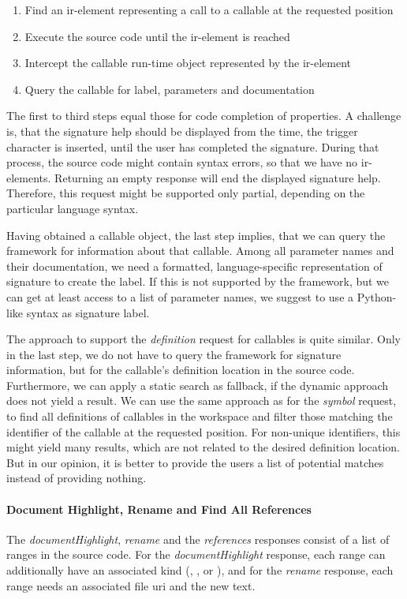\documentclass[sigplan,10pt,review,anonymous]{acmart}
\begin{document}
    \begin{enumerate}
        \item Find an \ac{ir}-element representing a call to a callable at the requested position
        \item Execute the source code until the \ac{ir}-element is reached
        \item Intercept the callable run-time object represented by the \ac{ir}-element
        \item Query the callable for label, parameters and documentation
    \end{enumerate}

    The first to third steps equal those for code completion of properties. A challenge is, that the signature help should be displayed from the time, the trigger character is inserted, until the user has completed the signature. During that process, the source code might contain syntax errors, so that we have no \ac{ir}-elements. Returning an empty response will end the displayed signature help. Therefore, this request might be supported only partial, depending on the particular language syntax.
    
    Having obtained a callable object, the last step implies, that we can query the framework for information about that callable. Among all parameter names and their documentation, we need a formatted, language-specific representation of signature to create the label. If this is not supported by the framework, but we can get at least access to a list of parameter names, we suggest to use a Python-like syntax  as signature label.

    The approach to support the \emph{definition} request for callables is quite similar. Only in the last step, we do not have to query the framework for signature information, but for the callable's definition location in the source code. Furthermore, we can apply a static search as fallback, if the dynamic approach does not yield a result. We can use the same approach as for the \emph{symbol} request, to find all definitions of callables in the workspace and filter those matching the identifier of the callable at the requested position. For non-unique identifiers, this might yield many results, which are not related to the desired definition location. But in our opinion, it is better to provide the users a list of potential matches instead of providing nothing.
    
    \paragraph{Document Highlight, Rename and Find All References}
    The \emph{documentHighlight}, \emph{rename} and the \emph{references}
    responses consist of a list of ranges in the source code. For the
    \emph{documentHighlight} response, each range can additionally have an
    associated kind (, , or
    ), and for the \emph{rename} response, each range needs an
    associated file \ac{uri} and the new text.
\end{document}
